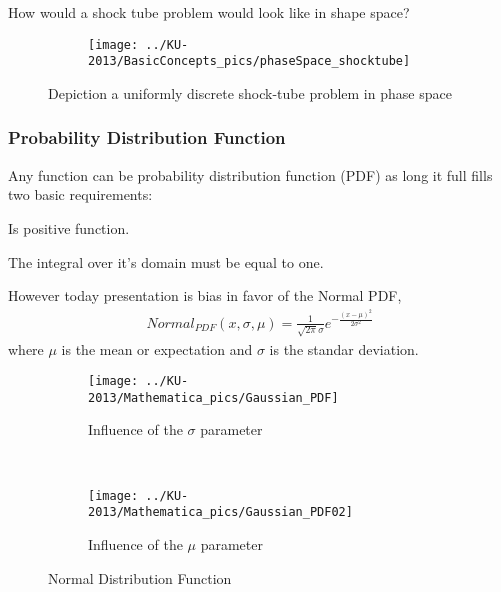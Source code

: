 \begin{frame}
How would a shock tube problem would look like in shape space?
 \begin{figure}
        \centering
        \begin{subfigure}[b]{0.60\textwidth}
                \centering
                \texttt{[image: ../KU-2013/BasicConcepts\_pics/phaseSpace\_shocktube]}
        \end{subfigure}%
        \caption{Depiction a uniformly discrete shock-tube problem in phase space}
        \label{fig:phaseSpace_1d_04}
 \end{figure}
\end{frame}

\begin{frame} \frametitle{Probability Distribution Function}
{
  Any function can be probability distribution function (PDF) as long it full fills two basic requirements:
  \begin{grassgreenitemize}
  \item Is positive function.
  \item The integral over it's domain must be equal to one.
  \end{grassgreenitemize}
}
\end{frame}


\begin{frame}
However today presentation is bias in favor of the Normal PDF,
 \begin{align*}
  Normal_{PDF}(x,\sigma,\mu) = \frac{1}{\sqrt{2 \pi } \sigma } e^{-\frac{(x-\mu )^2}{2 \sigma ^2}}
 \end{align*}
 where $\mu$ is the mean or expectation and $\sigma$ is the standar deviation. 
\end{frame}

\begin{frame}
  \begin{figure}
        \centering
        \begin{subfigure}[b]{0.45\textwidth}
                \centering
                \texttt{[image: ../KU-2013/Mathematica\_pics/Gaussian\_PDF]}
                \caption{Influence of the $\sigma$ parameter}
                \label{fig:Gaussian_PDF}
        \end{subfigure}%
        ~ %
        \begin{subfigure}[b]{0.45\textwidth}
                \centering
                \texttt{[image: ../KU-2013/Mathematica\_pics/Gaussian\_PDF02]}
                \caption{Influence of the $\mu$ parameter}
                \label{fig:Gaussian_PDF02}
        \end{subfigure}
        \caption{Normal Distribution Function}
	\label{fig:NormalDistributionFunction}
 \end{figure}  
\end{frame}

